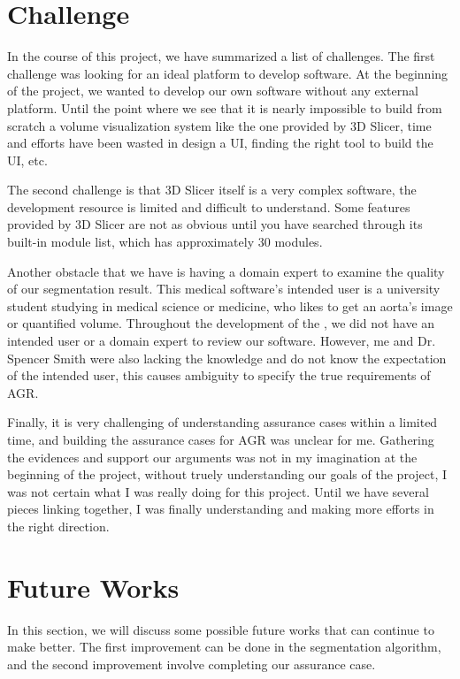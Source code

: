 \section{Challenge}\label{challenge}
In the course of this project, we have summarized a list of challenges. The first challenge was looking for an ideal platform to develop \progname{} software. At the beginning of the project, we wanted to develop our own software without any external platform. Until the point where we see that it is nearly impossible to build from scratch a volume visualization system like the one provided by 3D Slicer, time and efforts have been wasted in design a UI, finding the right tool to build the UI, etc. 

The second challenge is that 3D Slicer itself is a very complex software, the development resource is limited and difficult to understand. Some features provided by 3D Slicer are not as obvious until you have searched through its built-in module list, which has approximately 30 modules.

Another obstacle that we have is having a domain expert to examine the quality of our segmentation result. This medical software's intended user is a university student studying in medical science or medicine, who likes to get an aorta's image or quantified volume. Throughout the development of the \progname{}, we did not have an intended user or a domain expert to review our software. However, me and Dr. Spencer Smith were also lacking the knowledge and do not know the expectation of the intended user, this causes ambiguity to specify the true requirements of AGR.

Finally, it is very challenging of understanding assurance cases within a limited time, and building the assurance cases for AGR was unclear for me. Gathering the evidences and support our arguments was not in my imagination at the beginning of the project, without truely understanding our goals of the project, I was not certain what I was really doing for this project. Until we have several pieces linking together, I was finally understanding and making more efforts in the right direction. 

\section{Future Works}\label{fw}

In this section, we will discuss some possible future works that can continue to make \progname{} better. The first improvement can be done in the segmentation algorithm, and the second improvement involve completing our assurance case.

